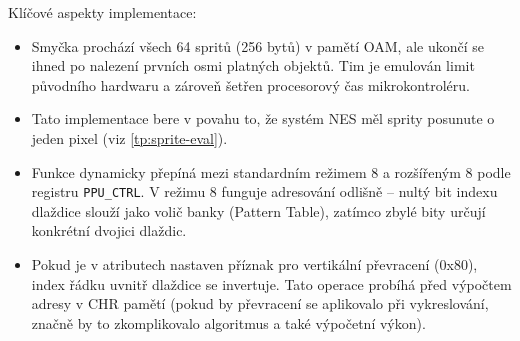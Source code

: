 \newpage

Klíčové aspekty implementace:

\begin{itemize}
    \item Smyčka prochází všech 64 spritů (256 bytů) v pamětí OAM, ale ukončí se ihned po nalezení
        prvních osmi platných objektů. Tim je emulován limit původního hardwaru a zároveň šetřen
        procesorový čas mikrokontroléru.
    \item Tato implementace bere v povahu to, že systém NES měl sprity posunute o jeden pixel (viz
        \ref{tp:sprite-eval}).
    \item Funkce dynamicky přepíná mezi standardním režimem 8 a rozšířeným 8
        podle registru \texttt{PPU\_CTRL}. V režimu 8 funguje adresování
        odlišně -- nultý bit indexu dlaždice slouží jako volič banky (Pattern Table), zatímco
        zbylé bity určují konkrétní dvojici dlaždic.
    \item Pokud je v atributech nastaven příznak pro vertikální převracení (0x80), index řádku
        uvnitř dlaždice se invertuje. Tato operace probíhá před výpočtem adresy v CHR pamětí (pokud
        by převracení se aplikovalo při vykreslování, značně by to zkomplikovalo algoritmus a také
        výpočetní výkon).
\end{itemize}

